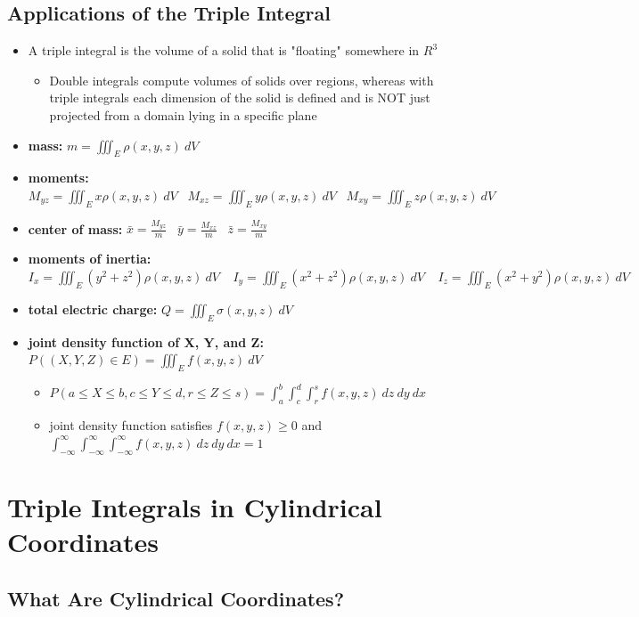 \documentclass{package/notes}
\begin{document}
\subsection{Applications of the Triple Integral}

\begin{itemize}
	\item A triple integral is the volume of a solid that is "floating" somewhere in $R^3$
	\begin{itemize}
		\item Double integrals compute volumes of solids over regions, whereas with triple integrals each dimension of the solid is defined and is NOT just projected from a domain lying in a specific plane
	\end{itemize}
	\item \textbf{mass:} $m = \iiint_E \rho(x,y,z)\:dV$
	\item \textbf{moments:} $M_{yz}=\iiint_Ex\rho(x,y,z)\:dV\;\;\;M_{xz}=\iiint_Ey\rho(x,y,z)\:dV\;\;\;M_{xy}=\iiint_E z\rho(x,y,z)\:dV$
	\item \textbf{center of mass:} $\bar{x}=\frac{M_{yz}}{m}\;\;\;\bar{y}=\frac{M_{xz}}{m}\;\;\;\bar{z}=\frac{M_{xy}}{m}$
	\item \textbf{moments of inertia:} $I_x=\iiint_E(y^2+z^2)\rho(x,y,z)\:dV\;\;\;\;I_y=\iiint_E(x^2+z^2)\rho(x,y,z)\:dV\;\;\;\;I_z=\iiint_E(x^2+y^2)\rho(x,y,z)\:dV$
	\item \textbf{total electric charge:} $Q = \iiint_E \sigma(x,y,z)\:dV$
	\item \textbf{joint density function of X, Y, and Z:} $P((X,Y,Z)\in E)=\iiint_Ef(x,y,z)\:dV$
	\begin{itemize}
		\item $P(a\le X\le b, c\le Y\le d, r\le Z\le s)=\int_a^b\int_c^d\int_r^sf(x,y,z)\:dz\:dy\:dx$
		\item joint density function satisfies $f(x,y,z)\ge 0$ and $\int_{-\infty}^\infty\int_{-\infty}^\infty\int_{-\infty}^\infty f(x,y,z)\:dz\:dy\:dx=1$
	\end{itemize}
\end{itemize}



\section{Triple Integrals in Cylindrical Coordinates}


\subsection{What Are Cylindrical Coordinates?}
\end{document}
